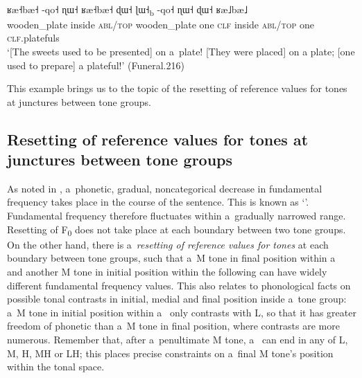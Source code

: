 \begin{exe}
	\ex
	\label{ex:Funeral2016}
	\\ 
	\gll ʁæ˧bæ˧		-qo˧	ɳɯ˧		ʁæ˧bæ˧	ɖɯ˧	ɭɯ˧\textsubscript{b}	-qo˧	ɳɯ˧		ɖɯ˧		ʁæ˩bæ˩\\
	wooden\_plate	inside	\textsc{abl/top}	wooden\_plate	one	\textsc{clf}		inside	\textsc{abl/top}	one		\textsc{clf}.platefuls\\
	\glt ‘[The sweets used to be presented] on a~plate! [They were placed] on a plate; [one used to prepare] a plateful!’ (Funeral.216)
\end{exe}

This example brings us to the topic of the resetting of reference values for tones at junctures
between tone groups.


\subsection[Resetting of reference values at junctures between tone groups]{Resetting of reference values for tones at junctures between tone groups}
\label{sec:resettingofreferencevaluesfortonesatjuncturesbetweentonegroups}

As noted in , 
a~phonetic, gradual, noncategorical decrease in fundamental frequency takes place in the course of the sentence. This is known as ‘’. Fundamental frequency therefore fluctuates within a~gradually narrowed
range. Resetting of F\textsubscript{0} does not take place at each boundary between two tone groups. On the other
hand, there is a~\textit{resetting of reference values for tones} at each boundary between tone groups, such
that a~M tone in final position within a~ and another M tone in initial position within
the following  can have widely different fundamental frequency values. This also relates
to phonological facts on possible tonal contrasts in initial, medial and final position inside a~tone group: a~M tone in initial position within a~ only contrasts with L, so that it has greater freedom of phonetic  than a~M tone in final position, where contrasts are more numerous. Remember that, after a~penultimate M tone, a~ can end in any of L, M, H, MH or LH; this places precise constraints on a~final M tone's position within the tonal space. 


